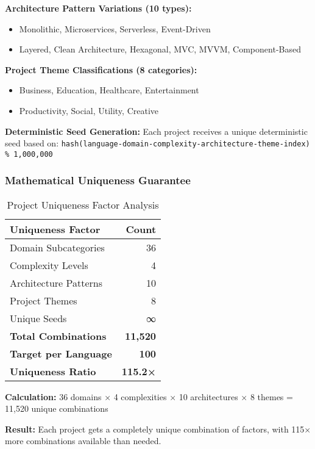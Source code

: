 \documentclass{article}
\begin{document}
\textbf{Architecture Pattern Variations (10 types):}
\begin{itemize}
    \item Monolithic, Microservices, Serverless, Event-Driven
    \item Layered, Clean Architecture, Hexagonal, MVC, MVVM, Component-Based
\end{itemize}

\textbf{Project Theme Classifications (8 categories):}
\begin{itemize}
    \item Business, Education, Healthcare, Entertainment
    \item Productivity, Social, Utility, Creative
\end{itemize}

\textbf{Deterministic Seed Generation:}
Each project receives a unique deterministic seed based on:
\texttt{hash(language-domain-complexity-architecture-theme-index) \% 1,000,000}

\subsubsection{Mathematical Uniqueness Guarantee}

\begin{table}[h]
\centering
\begin{tabular}{@{}lr@{}}
\toprule
\textbf{Uniqueness Factor} & \textbf{Count} \\
\midrule
Domain Subcategories & 36 \\
Complexity Levels & 4 \\
Architecture Patterns & 10 \\
Project Themes & 8 \\
Unique Seeds & ∞ \\
\midrule
\textbf{Total Combinations} & \textbf{11,520} \\
\textbf{Target per Language} & \textbf{100} \\
\textbf{Uniqueness Ratio} & \textbf{115.2×} \\
\bottomrule
\end{tabular}
\caption{Project Uniqueness Factor Analysis}
\end{table}

\textbf{Calculation:}
36 domains × 4 complexities × 10 architectures × 8 themes = 11,520 unique combinations

\textbf{Result:} Each project gets a completely unique combination of factors, with 115× more combinations available than needed.
\end{document}
